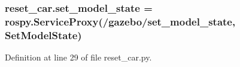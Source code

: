 \subsubsection[{\texorpdfstring{set\+\_\+model\+\_\+state}{set_model_state}}]{\setlength{\rightskip}{0pt plus 5cm}reset\+\_\+car.\+set\+\_\+model\+\_\+state = rospy.\+Service\+Proxy(\textquotesingle{}/gazebo/set\+\_\+model\+\_\+state\textquotesingle{}, Set\+Model\+State)}\hypertarget{namespacereset__car_a79ac68e30c39e4988f93ef77679b838c}{}\label{namespacereset__car_a79ac68e30c39e4988f93ef77679b838c}


Definition at line 29 of file reset\+\_\+car.\+py.

